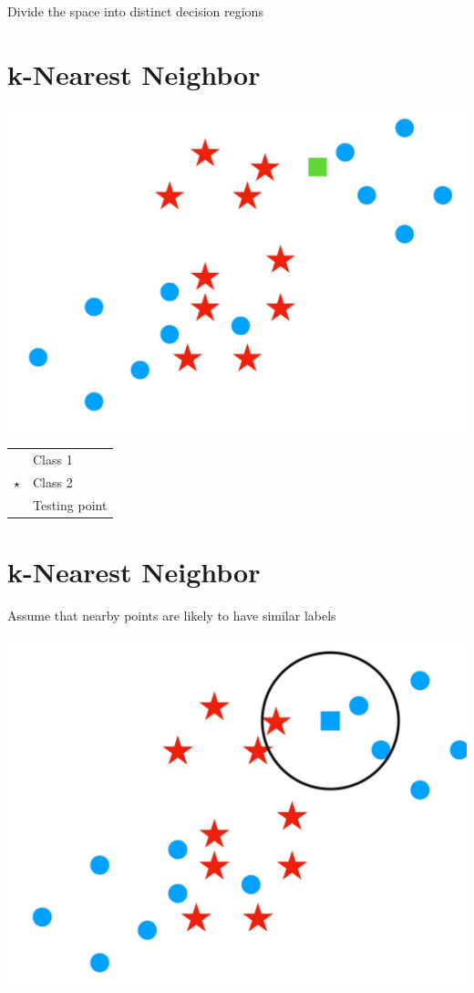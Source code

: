 \documentclass[10pt]{article}
\begin{document}
Divide the space into distinct decision regions

\section*{k-Nearest Neighbor}
\begin{center}
\includegraphics[max width=\textwidth]{2023_12_30_cf784c471dfd1dd5afbag-17}
\end{center}

\begin{center}
\begin{tabular}{|ll|}
\hline
 & Class 1 \\
$\star$ & Class 2 \\
 & Testing point \\
\hline
\end{tabular}
\end{center}

\section*{k-Nearest Neighbor}
Assume that nearby points are likely to have similar labels

\begin{center}
\includegraphics[max width=\textwidth]{2023_12_30_cf784c471dfd1dd5afbag-18}
\end{center}
\end{document}
